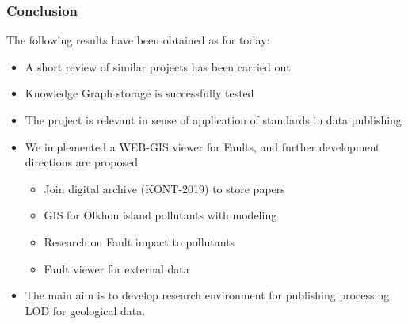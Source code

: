 \documentclass[10pt]{beamer}
\begin{document}
\begin{frame}
  \frametitle{Conclusion}
  The following results have been obtained as for today:
  \begin{itemize}
  \item A short review of similar projects has been carried out
  \item Knowledge Graph storage is successfully tested
  \item The project is relevant in sense of application of standards in data publishing
  \item We implemented a WEB-GIS viewer for Faults, and further development directions are proposed
    \begin{itemize}
    \item Join digital archive (KONT-2019) to store papers
    \item GIS for Olkhon island pollutants with modeling
    \item Research on Fault impact to pollutants
    \item Fault viewer for external data
    \end{itemize}
  \item The main aim is to develop research environment for publishing processing LOD for geological data.
  \end{itemize}
\end{frame}
\end{document}
